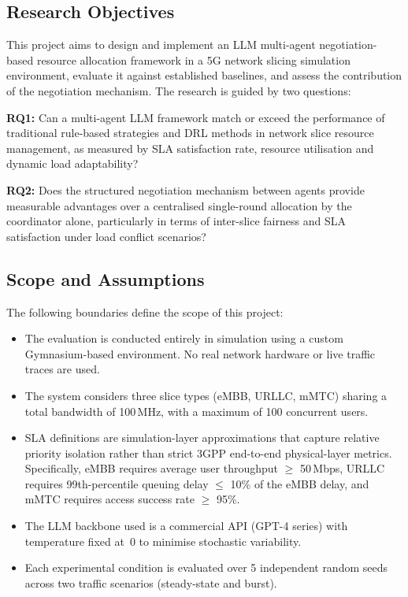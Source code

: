 \subsection{Research Objectives}

This project aims to design and implement an LLM multi-agent negotiation-based resource allocation framework in a 5G network slicing simulation environment, evaluate it against established baselines, and assess the contribution of the negotiation mechanism. The research is guided by two questions:

\textbf{RQ1:} Can a multi-agent LLM framework match or exceed the performance of traditional rule-based strategies and DRL methods in network slice resource management, as measured by SLA satisfaction rate, resource utilisation and dynamic load adaptability?

\textbf{RQ2:} Does the structured negotiation mechanism between agents provide measurable advantages over a centralised single-round allocation by the coordinator alone, particularly in terms of inter-slice fairness and SLA satisfaction under load conflict scenarios?

\subsection{Scope and Assumptions}

The following boundaries define the scope of this project:

\begin{itemize}
    \item The evaluation is conducted entirely in simulation using a custom Gymnasium-based environment. No real network hardware or live traffic traces are used.
    \item The system considers three slice types (eMBB, URLLC, mMTC) sharing a total bandwidth of 100\,MHz, with a maximum of 100 concurrent users.
    \item SLA definitions are simulation-layer approximations that capture relative priority isolation rather than strict 3GPP end-to-end physical-layer metrics. Specifically, eMBB requires average user throughput $\geq$ 50\,Mbps, URLLC requires 99th-percentile queuing delay $\leq$ 10\% of the eMBB delay, and mMTC requires access success rate $\geq$ 95\%.
    \item The LLM backbone used is a commercial API (GPT-4 series) with temperature fixed at~0 to minimise stochastic variability.
    \item Each experimental condition is evaluated over 5 independent random seeds across two traffic scenarios (steady-state and burst).
\end{itemize}


